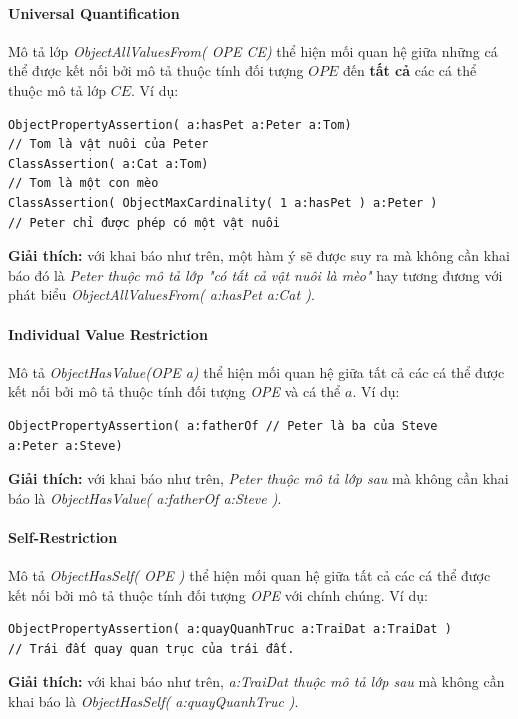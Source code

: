 \paragraph{Universal Quantification} Mô tả lớp \textit{ObjectAllValuesFrom( OPE CE)} thể hiện mối quan hệ giữa những cá thể được kết nối bởi mô tả thuộc tính đối tượng $OPE$ đến \textbf{tất cả} các cá thể thuộc mô tả lớp $CE$. Ví dụ: 
\begin{verbatim}
ObjectPropertyAssertion( a:hasPet a:Peter a:Tom)
// Tom là vật nuôi của Peter
ClassAssertion( a:Cat a:Tom) 
// Tom là một con mèo
ClassAssertion( ObjectMaxCardinality( 1 a:hasPet ) a:Peter )
// Peter chỉ được phép có một vật nuôi
\end{verbatim}
\textbf{Giải thích:} với khai báo như trên, một hàm ý sẽ được suy ra mà không cần khai báo đó là \textit{Peter thuộc mô tả lớp "có tất cả vật nuôi là mèo"} hay tương đương với phát biểu \textit{ObjectAllValuesFrom( a:hasPet a:Cat )}.

\paragraph{Individual Value Restriction} Mô tả  \textit{ObjectHasValue(OPE a)} thể hiện mối quan hệ giữa tất cả các cá thể được kết nối bởi mô tả thuộc tính đối tượng \textit{OPE} và cá thể $a$. Ví dụ:
\begin{verbatim}
ObjectPropertyAssertion( a:fatherOf // Peter là ba của Steve
a:Peter a:Steve)
\end{verbatim}
\textbf{Giải thích:} với khai báo như trên, \textit{Peter thuộc mô tả lớp sau} mà không cần khai báo là \textit{ObjectHasValue( a:fatherOf a:Steve )}.

\paragraph{Self-Restriction} Mô tả \textit{ObjectHasSelf( OPE )} thể hiện mối quan hệ giữa tất cả các cá thể được kết nối bởi mô tả thuộc tính đối tượng \textit{OPE} với chính chúng. Ví dụ:
\begin{verbatim}
ObjectPropertyAssertion( a:quayQuanhTruc a:TraiDat a:TraiDat )	
// Trái đất quay quan trục của trái đất.
\end{verbatim}
\textbf{Giải thích:} với khai báo như trên, \textit{a:TraiDat thuộc mô tả lớp sau} mà không cần khai báo là \textit{ObjectHasSelf( a:quayQuanhTruc )}.

